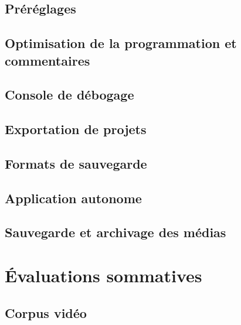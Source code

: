 \documentclass[
]{book}
\begin{document}
\hypertarget{pruxe9ruxe9glages}{%
\section{Préréglages}\label{pruxe9ruxe9glages}}

\hypertarget{optimisation-de-la-programmation-et-commentaires}{%
\section{Optimisation de la programmation et commentaires}\label{optimisation-de-la-programmation-et-commentaires}}

\hypertarget{console-de-duxe9bogage}{%
\section{Console de débogage}\label{console-de-duxe9bogage}}

\hypertarget{exportation-de-projets}{%
\section{Exportation de projets}\label{exportation-de-projets}}

\hypertarget{formats-de-sauvegarde}{%
\section{Formats de sauvegarde}\label{formats-de-sauvegarde}}

\hypertarget{application-autonome}{%
\section{Application autonome}\label{application-autonome}}

\hypertarget{sauvegarde-et-archivage-des-muxe9dias}{%
\section{Sauvegarde et archivage des médias}\label{sauvegarde-et-archivage-des-muxe9dias}}

\hypertarget{uxe9valuations-sommatives}{%
\chapter{Évaluations sommatives}\label{uxe9valuations-sommatives}}

\hypertarget{evaluation_1}{%
\section{Corpus vidéo}\label{evaluation_1}}
\end{document}
